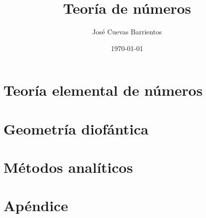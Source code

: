 \documentclass[11pt]{book}
\title{Teoría de números}
\author{José Cuevas Barrientos}
\date\today
\begin{document}
% 

\frontmatter
\maketitle
\tableofcontents


\mainmatter
\part{Teoría elemental de números}

\newrefsegment

% 


\newrefsegment

% 


\newrefsegment


\newrefsegment



\newrefsegment


\newrefsegment


\part{Geometría diofántica}
\newrefsegment


\newrefsegment





% 

\part{Métodos analíticos}
\newrefsegment


\newrefsegment


\newrefsegment


\newrefsegment


\part*{Apéndice}
\appendix

\listofexample
\printnomenclature


\printindex

\listoftodos
\end{document}
